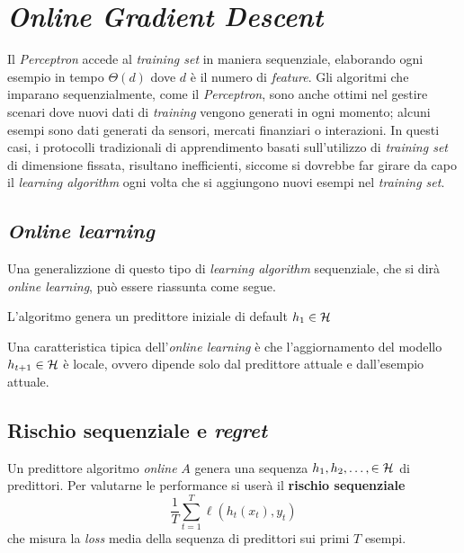 \section{\textit{Online Gradient Descent}}

Il \textit{Perceptron} accede al \textit{training set} in maniera sequenziale,
elaborando ogni esempio in tempo $\Theta(d)$ dove $d$ è il numero di 
\textit{feature}. Gli algoritmi che imparano sequenzialmente, come il
\textit{Perceptron}, sono anche ottimi nel gestire scenari dove nuovi dati di
\textit{training} vengono generati in ogni momento; alcuni esempi sono dati
generati da sensori, mercati finanziari o interazioni. In questi casi, i
protocolli tradizionali di apprendimento basati sull'utilizzo di
\textit{training set} di dimensione fissata, risultano inefficienti, siccome
si dovrebbe far girare da capo il \textit{learning algorithm} ogni volta che
si aggiungono nuovi esempi nel \textit{training set}.

\subsection{\textit{Online learning}}
Una generalizzione di questo tipo di \textit{learning algorithm} sequenziale,
che si dirà \textit{online learning}, può essere riassunta come segue.
\begin{algorithm}
    \DontPrintSemicolon
    \;
    L'algoritmo genera un predittore iniziale di default $h_1\in\mathcal{H}$\;
\end{algorithm}
\vspace{-1.5em}

Una caratteristica tipica dell'\textit{online learning} è che l'aggiornamento
del modello $h_{t+1}\in\mathcal{H}$ è locale, ovvero dipende solo dal predittore
attuale e dall'esempio attuale.

\subsection{Rischio sequenziale e \textit{regret}}
Un predittore algoritmo \textit{online} $A$ genera una sequenza
$h_1,h_2,\dots,\in\mathcal{H}$ di predittori. Per valutarne le performance si userà
il \textbf{rischio sequenziale}
$$ \frac{1}{T}\sum_{t=1}^{T}\ell(h_t(x_t),y_t) $$
che misura la \textit{loss} media della sequenza di predittori sui primi $T$
esempi.

